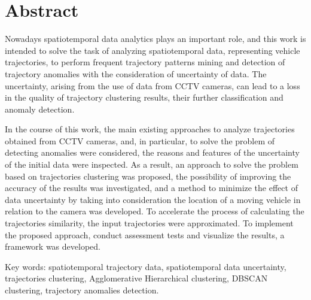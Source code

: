 \chapter*{Abstract}
\thispagestyle{empty}

Nowadays spatiotemporal data analytics plays an important role, and this work is intended to solve the task of analyzing spatiotemporal data, representing vehicle trajectories, to perform frequent trajectory patterns mining and detection of trajectory anomalies with the consideration of uncertainty of data. The uncertainty, arising from the use of data from CCTV cameras, can lead to a loss in the quality of trajectory clustering results, their further classification and anomaly detection.

In the course of this work, the main existing approaches to analyze trajectories obtained from CCTV cameras, and, in particular, to solve the problem of detecting anomalies were considered, the reasons and features of the uncertainty of the initial data were inspected. As a result, an approach to solve the problem based on trajectories clustering was proposed, the possibility of improving the accuracy of the results was investigated, and a method to minimize the effect of data uncertainty by taking into consideration the location of a moving vehicle in relation to the camera was developed. To accelerate the process of calculating the trajectories similarity, the input trajectories were approximated. To implement the proposed approach, conduct assessment tests and visualize the results, a framework was developed.

\bigbreak
Key words: spatiotemporal trajectory data, spatiotemporal data uncertainty, trajectories clustering, Agglomerative Hierarchical clustering, DBSCAN clustering, trajectory anomalies detection.